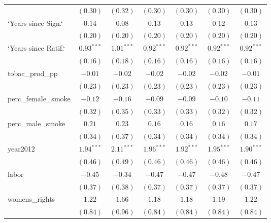 \begin{table}[!h]
\begin{center}
\begin{tabular}{l c c c c c c }
                        & $(0.30)$     & $(0.32)$     & $(0.30)$     & $(0.30)$     & $(0.30)$     & $(0.30)$     \\
`Years since Sign.`     & $0.14$       & $0.08$       & $0.13$       & $0.13$       & $0.12$       & $0.13$       \\
                        & $(0.20)$     & $(0.20)$     & $(0.20)$     & $(0.20)$     & $(0.20)$     & $(0.20)$     \\
`Years since Ratif.`    & $0.93^{***}$ & $1.01^{***}$ & $0.92^{***}$ & $0.92^{***}$ & $0.92^{***}$ & $0.92^{***}$ \\
                        & $(0.16)$     & $(0.18)$     & $(0.16)$     & $(0.16)$     & $(0.16)$     & $(0.16)$     \\
tobac\_prod\_pp         & $-0.01$      & $-0.02$      & $-0.02$      & $-0.02$      & $-0.02$      & $-0.01$      \\
                        & $(0.23)$     & $(0.23)$     & $(0.23)$     & $(0.23)$     & $(0.23)$     & $(0.23)$     \\
perc\_female\_smoke     & $-0.12$      & $-0.16$      & $-0.09$      & $-0.09$      & $-0.10$      & $-0.11$      \\
                        & $(0.32)$     & $(0.35)$     & $(0.33)$     & $(0.33)$     & $(0.32)$     & $(0.32)$     \\
perc\_male\_smoke       & $0.21$       & $0.23$       & $0.16$       & $0.16$       & $0.16$       & $0.17$       \\
                        & $(0.34)$     & $(0.37)$     & $(0.34)$     & $(0.34)$     & $(0.34)$     & $(0.34)$     \\
year2012                & $1.94^{***}$ & $2.11^{***}$ & $1.96^{***}$ & $1.92^{***}$ & $1.95^{***}$ & $1.90^{***}$ \\
                        & $(0.46)$     & $(0.49)$     & $(0.46)$     & $(0.46)$     & $(0.46)$     & $(0.46)$     \\
labor                   & $-0.45$      & $-0.34$      & $-0.47$      & $-0.47$      & $-0.48$      & $-0.47$      \\
                        & $(0.37)$     & $(0.38)$     & $(0.37)$     & $(0.37)$     & $(0.37)$     & $(0.37)$     \\
womens\_rights          & $1.22$       & $1.66$       & $1.18$       & $1.18$       & $1.19$       & $1.22$       \\
                        & $(0.84)$     & $(0.96)$     & $(0.84)$     & $(0.84)$     & $(0.84)$     & $(0.84)$     \\

\end{tabular}
\end{center}
\end{table}
